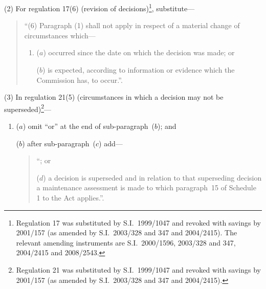 \documentclass[12pt,a4paper]{article}
\begin{document}
(2) For regulation 17(6) (revision of decisions)\footnote{Regulation 17 was substituted by S.I.~1999/1047 and revoked with savings by 2001/157 (as amended by S.I.~2003/328 and 347 and 2004/2415). The relevant amending instruments are S.I.~2000/1596, 2003/328 and 347, 2004/2415 and 2008/2543.}, substitute—
\begin{quotation}
“(6) Paragraph (1) shall not apply in respect of a material change of circumstances which—
\begin{enumerate}\item[]
($a$) occurred since the date on which the decision was made; or

($b$) is expected, according to information or evidence which the Commission has, to occur.”.
\end{enumerate}
\end{quotation}

(3) In regulation 21(5) (circumstances in which a decision may not be superseded)\footnote{Regulation 21 was substituted by S.I.~1999/1047 and revoked with savings by 2001/157 (as amended by S.I.~2003/328 and 347 and 2004/2415).}—
\begin{enumerate}\item[]
($a$) omit “or” at the end of sub-paragraph~($b$); and

($b$) after sub-paragraph~($c$)  add—
\begin{quotation}
“; or

($d$) a decision is superseded and in relation to that superseding decision a maintenance assessment is made to which paragraph~15 of Schedule 1 to the Act applies.”.
\end{quotation}
\end{enumerate}
\end{document}
